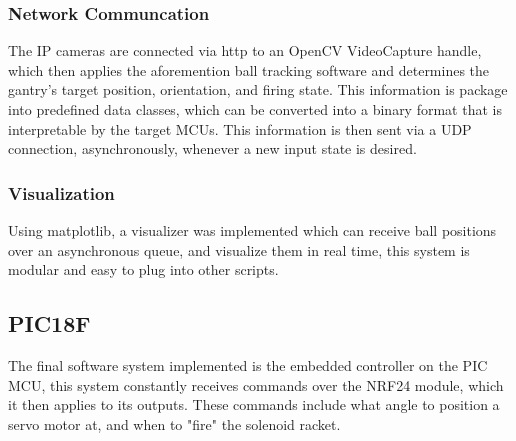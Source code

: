 \subsubsection{Network Communcation}
The IP cameras are connected via http to an OpenCV VideoCapture handle, which then applies the aforemention ball tracking software and determines the gantry's target position, orientation, and firing state. This information is package into predefined data classes, which can be converted into a binary format that is interpretable by the target MCUs. This information is then sent via a UDP connection, asynchronously, whenever a new input state is desired.

\subsubsection{Visualization}
Using matplotlib, a visualizer was implemented which can receive ball positions over an asynchronous queue, and visualize them in real time, this system is modular and easy to plug into other scripts.

\subsection{PIC18F}
The final software system implemented is the embedded controller on the PIC MCU, this system constantly receives commands over the NRF24 module, which it then applies to its outputs. These commands include what angle to position a servo motor at, and when to "fire" the solenoid racket.


